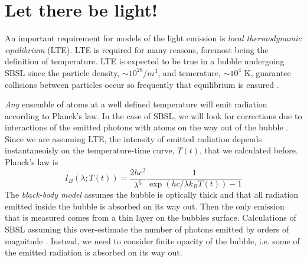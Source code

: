 \documentclass[rmp,aps,nofootinbib,superscriptaddress,floatfix]{revtex4-2}
\begin{document}
\section{Let there be light!}
An important requirement for models of the light emission is \emph{local thermodynamic equilibrium} (LTE). LTE is required for many reasons, foremost being the definition of temperature. LTE is expected to be true in a bubble undergoing SBSL since the particle density, $\sim 10^{28}/m^3$, and temerature, $\sim 10^4$ K, guarantee collisions between particles occur so frequently that equilibrium is ensured \cite{brenner2002single,hilgenfeldt1999sonoluminescence,yasui1999mechanism}.

\emph{Any} ensemble of atoms at a well defined temperature will emit radiation according to Planck's law. In the case of SBSL, we will look for corrections due to interactions of the emitted photons with atoms on the way out of the bubble \cite{hilgenfeldt1999sonoluminescence}. Since we are assuming LTE, the intensity of emitted radiation depends instantaneoisly on the temperature-time curve, $T(t)$, that we calculated before. Planck's law is \cite{schroeder1999introduction}
\begin{equation}
    I_{B}(\lambda;T(t))=\frac{2 h c^2}{\lambda^5}\frac{1}{\exp(hc/\lambda k_B T(t))-1}
\end{equation}
The \emph{black-body model} assumes the bubble is optically thick and that all radiation emitted inside the bubble is absorbed on its way out. Then the only emission that is measured comes from a thin layer on the bubbles surface. Calculations of SBSL assuming this over-estimate the number of photons emitted by orders of magnitude \cite{hilgenfeldt1999simple,brenner2002single}. Instead, we need to consider finite opacity of the bubble, i.e. some of the emitted radiation is absorbed on its way out.
\end{document}
